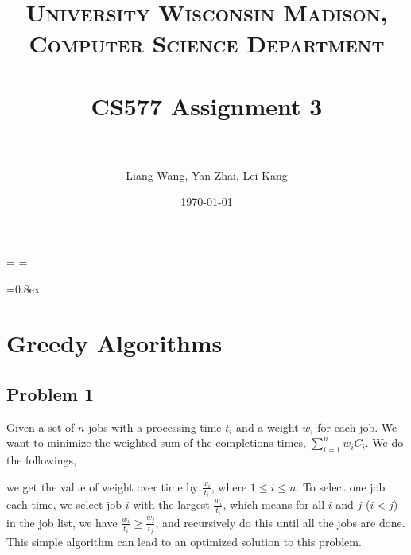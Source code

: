 \documentclass[paper=a4, fontsize=11pt]{scrartcl} %
\title{	
\normalfont \normalsize 
\textsc{University Wisconsin Madison, Computer Science Department} \\ [25pt] %
\horrule{0.5pt} \\[0.4cm] %
\huge CS577 Assignment 3\\ %
\horrule{2pt} \\[0.5cm] %
}
\author{Liang Wang, Yan Zhai, Lei Kang} %
\date{\normalsize\today} %
\numberwithin{equation}{section} %
\numberwithin{figure}{section} %
\numberwithin{table}{section} %
\begin{document}
\maketitle %

\singlespacing
\newdimen\origiwspc%
\newdimen\origiwstr%
\origiwspc=\font%
\origiwstr=\font

\font=0.8ex

\section*{Greedy Algorithms}

\subsection*{Problem 1}

Given a set of $n$ jobs with a processing time $t_i$ and a weight $w_i$ for each job. We want to minimize the weighted sum of the completions times, $\sum_{i=1}^{n} {w_iC_i}$. We do the followings,

we get the value of weight over time by $\frac{w_i}{t_i}$, where $1 \leq i \leq n$. To select one job each time, we select job $i$ with the largest $\frac{w_i}{t_i}$, which means for all $i$ and $j$ ($i < j$) in the job list, we have $\frac{w_i}{t_i} \geq \frac{w_j}{t_j}$, and recursively do this until all the jobs are done. This simple algorithm can lead to an optimized solution to this problem.
\end{document}
